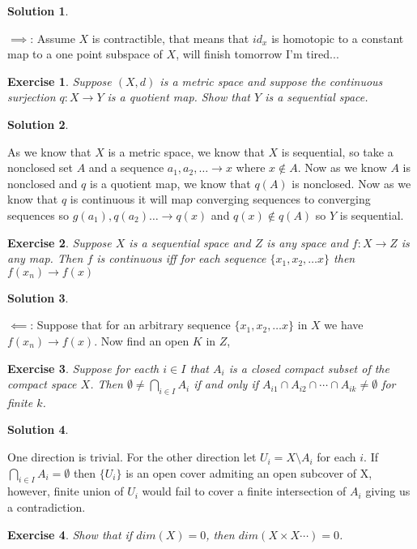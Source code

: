 \documentclass[11pt,a4paper]{article}
\newtheorem{Ex}{Exercise}
\newtheorem{Sol}{Solution}
\newcommand{\ra}{\rightarrow}
\begin{document}
\begin{Sol}\end{Sol}
\noindent $\implies$: Assume $X$ is contractible, that means that $id_x$ is homotopic to a constant map to a one point subspace of $X$, will finish tomorrow I'm tired...

\begin{Ex}
	Suppose $(X,d)$ is a metric space and suppose the continuous surjection $q: X \ra Y$ is a quotient map. Show that $Y$ is a sequential space.
\end{Ex}

\begin{Sol}\end{Sol}
\noindent As we know that $X$ is a metric space, we know that $X$ is sequential, so take a nonclosed set $A$ and a sequence $a_1,a_2,\dots \ra x$ where $x \not\in A$. Now as we know $A$ is nonclosed and $q$ is a quotient map, we know that $q(A)$ is nonclosed. Now as we know that $q$ is continuous it will map converging sequences to converging sequences so $g(a_1), q(a_2) \dots \ra q(x)$ and $q(x) \not\in q(A)$ so $Y$ is sequential.

\begin{Ex}
	Suppose $X$ is a sequential space and $Z$ is any space and $f: X\ra Z$ is any map. Then $f$ is continuous iff for each sequence $\{x_1,x_2,\dots x\}$ then $f(x_n) \ra f(x)$  
\end{Ex}

\begin{Sol}
\end{Sol}
\noindent $\impliedby$: Suppose that for an arbitrary sequence $\{x_1,x_2,\dots x\}$ in $X$ we have $f(x_n) \ra f(x)$. Now find an open $K$ in $Z$,    


\begin{Ex}
	Suppose for eacth $i\in I$ that $A_i$ is a closed compact subset of the compact space $X$. Then $\emptyset \neq \bigcap_{i \in I}A_i$ if and only if $A_{i1} \cap A_{i2} \cap \cdots \cap A_{ik} \neq \emptyset$ for finite $k$.
\end{Ex}
\begin{Sol}
\end{Sol}
\noindent One direction is trivial. For the other direction let $U_i = X \setminus A_i$ for each $i$. If $\bigcap_{i \in I}A_i = \emptyset$ then $\{U_i\}$ is an open cover admiting an open subcover  of X, however,  finite union of $U_i$ would fail to cover a finite intersection of $A_i$ giving us a contradiction.

\begin{Ex}
	Show that if $dim(X) = 0$, then $dim(X \times X \cdots) = 0$.
\end{Ex}
\end{document}
